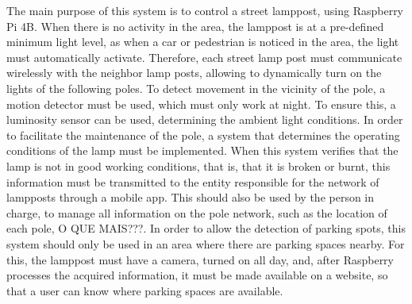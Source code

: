 %
%
The main purpose of this system is to control a street lamppost, using Raspberry Pi 4B. When there is no activity in the area, the lamppost is at a pre-defined minimum light level, as when a car or pedestrian is noticed in the area, the light must automatically activate. Therefore, each street lamp post must communicate wirelessly with the neighbor lamp posts, allowing to dynamically turn on the lights of the following poles. To detect movement in the vicinity of the pole, a motion detector must be used, which must only work at night. To ensure this, a luminosity sensor can be used, determining the ambient light conditions. In order to facilitate the maintenance of the pole, a system that determines the operating conditions of the lamp must be implemented. When this system verifies that the lamp is not in good working conditions, that is, that it is broken or burnt, this information must be transmitted to the entity responsible for the network of lampposts through a mobile app. This should also be used by the person in charge, to manage all information on the pole network, such as the location of each pole, O QUE MAIS???. In order to allow the detection of parking spots, this system should only be used in an area where there are parking spaces nearby. For this, the lamppost must have a camera, turned on all day, and, after Raspberry processes the acquired information, it must be made available on a website, so that a user can know where parking spaces are available.